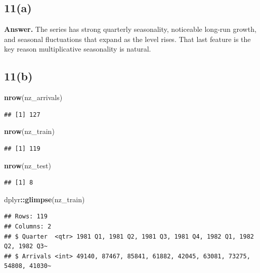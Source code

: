 \documentclass[
  11pt,
]{article}
\newenvironment{Shaded}{\begin{snugshade}}{\end{snugshade}}
\newcommand{\FunctionTok}[1]{\textcolor[rgb]{0.13,0.29,0.53}{\textbf{#1}}}
\newcommand{\NormalTok}[1]{#1}
\newcommand{\SpecialCharTok}[1]{\textcolor[rgb]{0.81,0.36,0.00}{\textbf{#1}}}
\begin{document}
\subsection{11(a)}\label{a-4}

\textbf{Answer.} The series has strong quarterly seasonality, noticeable
long-run growth, and seasonal fluctuations that expand as the level
rises. That last feature is the key reason multiplicative seasonality is
natural.

\subsection{11(b)}\label{b-4}

\begin{Shaded}
\begin{Highlighting}[]
\FunctionTok{nrow}\NormalTok{(nz\_arrivals)}
\end{Highlighting}
\end{Shaded}

\begin{verbatim}
## [1] 127
\end{verbatim}

\begin{Shaded}
\begin{Highlighting}[]
\FunctionTok{nrow}\NormalTok{(nz\_train)}
\end{Highlighting}
\end{Shaded}

\begin{verbatim}
## [1] 119
\end{verbatim}

\begin{Shaded}
\begin{Highlighting}[]
\FunctionTok{nrow}\NormalTok{(nz\_test)}
\end{Highlighting}
\end{Shaded}

\begin{verbatim}
## [1] 8
\end{verbatim}

\begin{Shaded}
\begin{Highlighting}[]
\NormalTok{dplyr}\SpecialCharTok{::}\FunctionTok{glimpse}\NormalTok{(nz\_train)}
\end{Highlighting}
\end{Shaded}

\begin{verbatim}
## Rows: 119
## Columns: 2
## $ Quarter  <qtr> 1981 Q1, 1981 Q2, 1981 Q3, 1981 Q4, 1982 Q1, 1982 Q2, 1982 Q3~
## $ Arrivals <int> 49140, 87467, 85841, 61882, 42045, 63081, 73275, 54808, 41030~
\end{verbatim}
\end{document}
